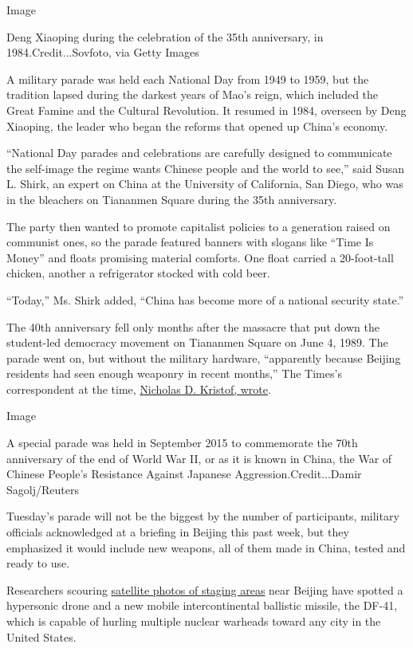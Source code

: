 Image

Deng Xiaoping during the celebration of the 35th anniversary, in
1984.Credit...Sovfoto, via Getty Images

A military parade was held each National Day from 1949 to 1959, but the
tradition lapsed during the darkest years of Mao's reign, which included
the Great Famine and the Cultural Revolution. It resumed in 1984,
overseen by Deng Xiaoping, the leader who began the reforms that opened
up China's economy.

``National Day parades and celebrations are carefully designed to
communicate the self-image the regime wants Chinese people and the world
to see,'' said Susan L. Shirk, an expert on China at the University of
California, San Diego, who was in the bleachers on Tiananmen Square
during the 35th anniversary.

The party then wanted to promote capitalist policies to a generation
raised on communist ones, so the parade featured banners with slogans
like ``Time Is Money'' and floats promising material comforts. One float
carried a 20-foot-tall chicken, another a refrigerator stocked with cold
beer.

``Today,'' Ms. Shirk added, ``China has become more of a national
security state.''

The 40th anniversary fell only months after the massacre that put down
the student-led democracy movement on Tiananmen Square on June 4, 1989.
The parade went on, but without the military hardware, ``apparently
because Beijing residents had seen enough weaponry in recent months,''
The Times's correspondent at the time,
\href{https://www.nytimes3xbfgragh.onion/1989/10/02/world/people-s-china-celebrates-but-without-the-people.html}{Nicholas
D. Kristof, wrote}.

Image

A special parade was held in September 2015 to commemorate the 70th
anniversary of the end of World War II, or as it is known in China, the
War of Chinese People's Resistance Against Japanese
Aggression.Credit...Damir Sagolj/Reuters

Tuesday's parade will not be the biggest by the number of participants,
military officials acknowledged at a briefing in Beijing this past week,
but they emphasized it would include new weapons, all of them made in
China, tested and ready to use.

Researchers scouring
\href{https://www.frstrategie.org/sites/default/files/documents/publications/images-strategiques/2019/strategic-imagery-military-parade-70th-anniversary-PRC-2019.pdf}{satellite
photos of staging areas} near Beijing have spotted a hypersonic drone
and a new mobile intercontinental ballistic missile, the DF-41, which is
capable of hurling multiple nuclear warheads toward any city in the
United States.

